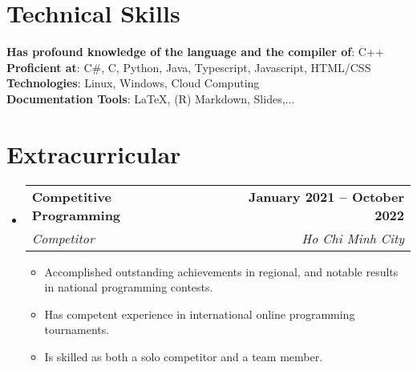 \documentclass[letterpaper,11pt]{article}
\makeatletter
\newcommand{\resumeItem}[1]{
\item\small{
{#1 \vspace{-2pt}}
}
}
\newcommand{\resumeSubheading}[4]{
\vspace{-2pt}\item
\begin{tabular*}{1.0\textwidth}[t]{l@{\extracolsep{\fill}}r}
\textbf{#1} & \textbf{\small #2} \\
\textit{\small#3} & \textit{\small #4} \\
    \end{tabular*}\vspace{-7pt}
}
\newcommand{\resumeSubHeadingListStart}{\begin{itemize}[leftmargin=0.0in, label={}]}
\newcommand{\resumeSubHeadingListEnd}{\end{itemize}}
\newcommand{\resumeItemListStart}{\begin{itemize}}
\newcommand{\resumeItemListEnd}{\end{itemize}\vspace{-5pt}}
\makeatother
\begin{document}
\section{Technical Skills}
\begin{itemize}[leftmargin=0.15in, label={}]
\small{\item{
\textbf{Has profound knowledge of the language and the compiler of}{: C++} \\
\textbf{Proficient at}{: C\#, C, Python, Java, Typescript, Javascript, HTML/CSS} \\
\textbf{Technologies}{: Linux, Windows, Cloud Computing} \\
\textbf{Documentation Tools}{: LaTeX, (R) Markdown, Slides,...} \\
}}
\end{itemize}
\vspace{-16pt}


\section{Extracurricular}
\resumeSubHeadingListStart
\resumeSubheading{Competitive Programming}{January 2021 -- October 2022}{Competitor}{Ho Chi Minh City}
\resumeItemListStart
\resumeItem{Accomplished outstanding achievements in regional, and notable results in national programming contests.}
\resumeItem{Has competent experience in international online programming tournaments.}
\resumeItem{Is skilled as both a solo competitor and a team member.}
\resumeItemListEnd
\resumeSubHeadingListEnd
\end{document}

